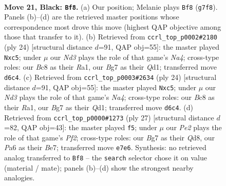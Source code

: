 \documentclass[11pt]{article}
\begin{document}
\clearpage

\begin{figure}[p]\centering
\begin{subfigure}{0.46\textwidth}\centering
\resizebox{\linewidth}{!}{%
\newchessgame
\chessboard[
  setfen={2bqr2k/rp1pppbp/p2n4/3Q4/P1PP4/2N2N1B/1P3P1P/R1B2RK1 b - - 0 21},
  showmover=false,
  pgfstyle=straightmove, color=movearrow, markmove={g7-f8}
]}
\caption{}
\end{subfigure}\hfill
\begin{subfigure}{0.46\textwidth}\centering
\resizebox{\linewidth}{!}{%
\newchessgame
\chessboard[
  setfen={r1br2k1/pp3ppp/2n2n2/q1b5/N2p4/PP3NP1/2P2PBP/R1BQ1RK1 w - - 1 13},
  showmover=false,
  pgfstyle=straightmove, color=movearrow, markmove={a4-c5}
]}
\caption{}
\end{subfigure}
\\[4pt]
\begin{subfigure}{0.46\textwidth}\centering
\resizebox{\linewidth}{!}{%
\newchessgame
\chessboard[
  setfen={r1br2k1/pp3ppp/2n2n2/q1b5/N2p4/PP3NP1/2P2PBP/R1BQ1RK1 w - - 1 13},
  showmover=false,
  pgfstyle=straightmove, color=movearrow, markmove={a4-c5}
]}
\caption{}
\end{subfigure}\hfill
\begin{subfigure}{0.46\textwidth}\centering
\resizebox{\linewidth}{!}{%
\newchessgame
\chessboard[
  setfen={r1bq1rk1/pp2bpp1/2n1p2p/8/3PQ3/P2B1N2/1P1B1PPP/R4RK1 b - - 0 14},
  showmover=false,
  pgfstyle=straightmove, color=movearrow, markmove={f7-f5}
]}
\caption{}
\end{subfigure}
\caption{\textbf{Move 21, Black: \texttt{Bf8}.} (a) Our position; Melanie plays \texttt{Bf8} (\texttt{g7f8}). Panels (b)--(d) are the retrieved master positions whose correspondence most drove this move (highest QAP objective among those that transfer to it). (b) Retrieved from \texttt{ccrl\_top\_p0002\#2180} (ply 24) [structural distance $d$=91, QAP obj=55]: the master played \texttt{Nxc5}; under $\mu$ our \emph{Nd3} plays the role of that game's \emph{Na4}; cross-type roles: our \emph{B}c8 as their \emph{R}a1, our \emph{B}g7 as their \emph{Q}d1; transferred move \texttt{d6c4}. (c) Retrieved from \texttt{ccrl\_top\_p0003\#2634} (ply 24) [structural distance $d$=91, QAP obj=55]: the master played \texttt{Nxc5}; under $\mu$ our \emph{Nd3} plays the role of that game's \emph{Na4}; cross-type roles: our \emph{B}c8 as their \emph{R}a1, our \emph{B}g7 as their \emph{Q}d1; transferred move \texttt{d6c4}. (d) Retrieved from \texttt{ccrl\_top\_p0000\#1273} (ply 27) [structural distance $d$=82, QAP obj=43]: the master played \texttt{f5}; under $\mu$ our \emph{Pe2} plays the role of that game's \emph{Pf2}; cross-type roles: our \emph{B}g7 as their \emph{Q}d8, our \emph{P}a6 as their \emph{B}e7; transferred move \texttt{e7e6}. Synthesis: no retrieved analog transferred to \texttt{Bf8} -- the \texttt{search} selector chose it on value (material / mate); panels (b)--(d) show the strongest nearby analogies.}
\label{fig:thought-m41}
\end{figure}
\end{document}
